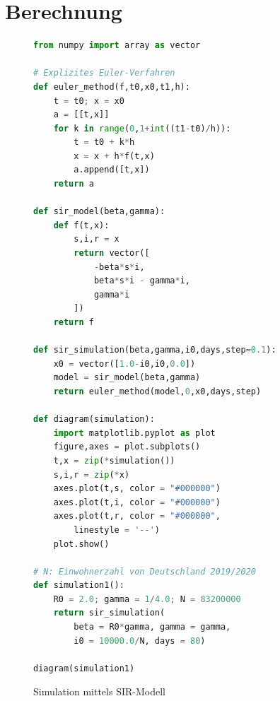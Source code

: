 \documentclass[a4paper,10pt,fleqn,twocolumn,twoside,dvipdfmx]{scrartcl}
\numberwithin{equation}{section}
\begin{document}
\newpage
\section{Berechnung}

\begin{figure}[h!]
\begin{lstlisting}[language=Python]
from numpy import array as vector

# Explizites Euler-Verfahren
def euler_method(f,t0,x0,t1,h):
    t = t0; x = x0
    a = [[t,x]]
    for k in range(0,1+int((t1-t0)/h)):
        t = t0 + k*h
        x = x + h*f(t,x)
        a.append([t,x])
    return a

def sir_model(beta,gamma):
    def f(t,x):
        s,i,r = x
        return vector([
            -beta*s*i,
            beta*s*i - gamma*i,
            gamma*i
        ])
    return f

def sir_simulation(beta,gamma,i0,days,step=0.1):
    x0 = vector([1.0-i0,i0,0.0])
    model = sir_model(beta,gamma)
    return euler_method(model,0,x0,days,step)

def diagram(simulation):
    import matplotlib.pyplot as plot
    figure,axes = plot.subplots()
    t,x = zip(*simulation())
    s,i,r = zip(*x)
    axes.plot(t,s, color = "#000000")
    axes.plot(t,i, color = "#000000")
    axes.plot(t,r, color = "#000000",
        linestyle = '--')
    plot.show()

# N: Einwohnerzahl von Deutschland 2019/2020
def simulation1():
    R0 = 2.0; gamma = 1/4.0; N = 83200000
    return sir_simulation(
        beta = R0*gamma, gamma = gamma,
        i0 = 10000.0/N, days = 80)

diagram(simulation1)
\end{lstlisting}
\caption{Simulation mittels SIR-Modell}
\end{figure}
\end{document}
